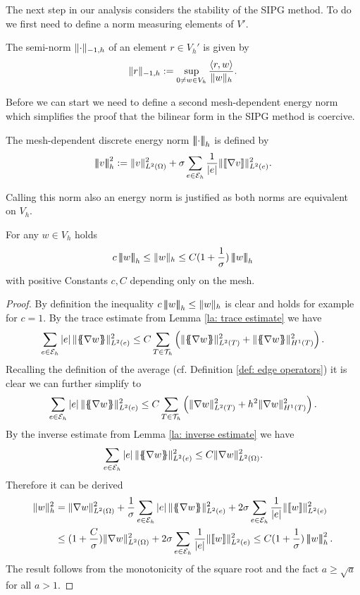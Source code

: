 The next step in our analysis considers the stability of the SIPG method. To do we first need to define a norm measuring elements of $V'$.
\begin{definition} \label{def: h-1 seminorm}
	The semi-norm $\lVert \cdot \rVert_{-1,h} $ of an element $r \in V_h'$ is given by 
	\[
	\lVert r \rVert_{-1,h}  := \sup_{0 \neq w \in V_h} \frac {{ \langle r, w \rangle } } {\lVert w \rVert_{h}}.
	\]
\end{definition}
Before we can start we need to define a second mesh-dependent energy norm which simplifies the proof that the bilinear form in the SIPG method is coercive.
\begin{definition}\label{energy norm2}
	The mesh-dependent discrete energy norm $\left| \! \left| \! \left| \cdot \right| \! \right| \! \right|_{h} $ is defined by
	\[
	\left| \! \left| \! \left| v \right| \! \right| \! \right|_{h}^2 :=  \lVert v \rVert_{L^2(\Omega)}^2 +  \sigma \sum_{e \in \mathcal{E}_h} \frac 1 {|e|}\lVert \llbracket \nabla v \rrbracket \rVert_{L^2(e)}^2.
	\]
\end{definition}
Calling this norm also an energy norm is justified as both norms are equivalent on $V_h$.
\begin{lemma} \label{la: equivalence energy norm}
	For any $w \in V_h$ holds
	\[
	c \eNormTwo w \leq \eNorm w \leq C(1+\frac  1 \sigma)\eNormTwo w
	\]
	with positive Constants $c, C$ depending only on the mesh.
\end{lemma}
\begin{proof}
	By definition the inequality $c \left| \! \left| \! \left| w \right| \! \right| \! \right|_{h} \leq \lVert w \rVert_{h}$ is clear and holds for example for $c=1$. 
	By the trace estimate from Lemma \ref{la: trace estimate} we have
	\begin{align*}
	\sum_{e \in \edges} \singleNorm e \LTwonormE{\average{\nabla w}}^2 
	\leq C \sum_{T \in \triang} \left( \LTwonormT{\average{\nabla w}}^2 +\HOnenormT{\average{\nabla w}}^2   \right).
	\end{align*}
	Recalling the definition of the average (cf. Definition \ref{def: edge operators}) it is clear we can further simplify to
	\begin{align*}
	\sum_{e \in \mathcal{E}_h} \left| e \right| \lVert \{\!\!\{ \nabla w \}\!\!\} \rVert_{L^2(e)}^2 
	\leq C \sum_{T \in \mathcal{T}_h} \left( \lVert \nabla w \rVert_{L^2(T)}^2 +h^2 \lVert  \nabla w \rVert_{H^1(T)}^2   \right).
	\end{align*}
	By the inverse estimate from Lemma \ref{la: inverse estimate} we have 
	\begin{align}
	\sum_{e \in \mathcal{E}_h} \left| e \right|  \lVert \{\!\!\{ \nabla w \}\!\!\} \rVert_{L^2(e)}^2 \leq C \lVert \nabla w \rVert_{L^2(\Omega)}^2. \label{eq: estimate average}
	\end{align}
	Therefore it can be derived
	\begin{align*}
		\eNorm{w}^2 
		&= \LTwonorm{\nabla w}^2
			+ \frac 1 \sigma \sum_{e \in \edges} \singleNorm e \LTwonormE{\average{\nabla w}}^2  
			+ 2 \sigma \sum_{e \in \edges} \frac 1 {|e|} \LTwonormE{\jump{w}}^2 \\
		&\leq (1+\frac C \sigma) \LTwonorm{\nabla w}^2 
			+ 2 \sigma \sum_{e \in \edges} \frac 1 {|e|} \LTwonormE{\jump{w}}^2 
		\leq C(1+\frac 1 \sigma) \eNormTwo{w}^2.
	\end{align*}
The result follows from the monotonicity of the square root and the fact $a \geq \sqrt a$ for all $a > 1$.
\end{proof}

